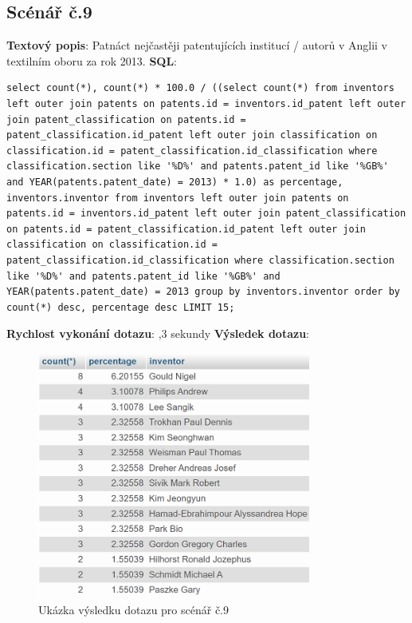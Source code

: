 \newpage
\subsection{Scénář č.9}
\textbf{Textový popis}: Patnáct nejčastěji patentujících institucí / autorů v Anglii v textilním oboru za rok 2013.
\newline
\textbf{SQL}: 
\begin{lstlisting}[label = {lst:elements_a}]
select count(*), count(*) * 100.0 / ((select count(*) from inventors left outer join patents on patents.id = inventors.id_patent left outer join patent_classification on patents.id = patent_classification.id_patent left outer join classification on classification.id = patent_classification.id_classification where classification.section like '%D%' and patents.patent_id like '%GB%' and YEAR(patents.patent_date) = 2013) * 1.0) as percentage, inventors.inventor from inventors left outer join patents on patents.id = inventors.id_patent left outer join patent_classification on patents.id = patent_classification.id_patent left outer join classification on classification.id = patent_classification.id_classification where classification.section like '%D%' and patents.patent_id like '%GB%' and YEAR(patents.patent_date) = 2013 group by inventors.inventor order by count(*) desc, percentage desc LIMIT 15;
\end{lstlisting}
\textbf{Rychlost vykonání dotazu}: ,3 sekundy
\newline
\textbf{Výsledek dotazu}:
\begin{figure}[H]
\centering
\includegraphics[width=9cm]{img/scenare/scenar_9}
\caption{Ukázka výsledku dotazu pro scénář č.9}
\label{fig:scenar9}
\end{figure}